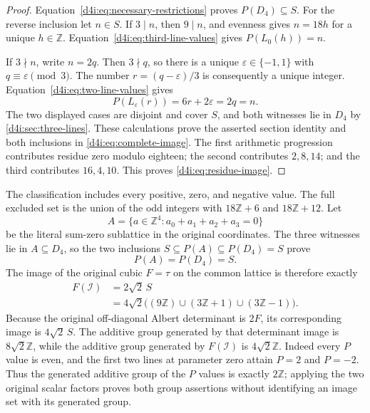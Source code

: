 \begin{proof}
Equation~\eqref{d4i:eq:necessary-restrictions} proves
$P(D_4)\subseteq S$. For the reverse inclusion let $n\in S$.
If $3\mid n$, then $9\mid n$, and evenness gives $n=18h$ for
a unique $h\in\mathbb Z$. Equation~\eqref{d4i:eq:third-line-values}
gives $P(L_0(h))=n$.

If $3\nmid n$, write $n=2q$. Then $3\nmid q$, so there is a
unique $\varepsilon\in\{-1,1\}$ with
$q\equiv\varepsilon\pmod3$. The number
$r=(q-\varepsilon)/3$ is consequently a unique integer.
Equation~\eqref{d4i:eq:two-line-values} gives
\[
                    P(L_\varepsilon(r))=6r+2\varepsilon=2q=n.
\]
The two displayed cases are disjoint and cover $S$, and both
witnesses lie in $D_4$ by \cref{d4i:sec:three-lines}. These
calculations prove the asserted section identity and both inclusions
in \eqref{d4i:eq:complete-image}. The first arithmetic progression
contributes residue zero modulo eighteen; the second contributes
$2,8,14$; and the third contributes $16,4,10$. This proves
\eqref{d4i:eq:residue-image}.
\end{proof}

The classification includes every positive, zero, and negative value.
The full excluded set is the union of the odd integers with
$18\mathbb Z+6$ and $18\mathbb Z+12$.
Let
\[
 A=\{a\in\mathbb Z^4:a_0+a_1+a_2+a_3=0\}
 \label{d4i:eq:sum-zero-slice}\tag{D4I15}
\]
be the literal sum-zero sublattice in the original coordinates. The
three witnesses lie in $A\subseteq D_4$, so the two inclusions
$S\subseteq P(A)\subseteq P(D_4)=S$ prove
\[
                              P(A)=P(D_4)=S.
 \label{d4i:eq:slice-image}\tag{D4I16}
\]
The image of the original cubic $F=\tau$ on the common lattice is
therefore exactly
\[
\begin{aligned}
 F(\mathcal I)&=2\sqrt2\,S\\
 &=4\sqrt2\bigl((9\mathbb Z)\cup(3\mathbb Z+1)
                                     \cup(3\mathbb Z-1)\bigr).
\end{aligned}
 \label{d4i:eq:original-cubic-image}\tag{D4I17}
\]
Because the original off-diagonal Albert determinant is $2F$, its
corresponding image is $4\sqrt2\,S$. The additive group generated
by that determinant image is $8\sqrt2\mathbb Z$, while the
additive group generated by $F(\mathcal I)$ is $4\sqrt2\mathbb Z$.
Indeed every $P$ value is even, and the first two lines at parameter
zero attain $P=2$ and $P=-2$. Thus the generated additive group of
the $P$ values is exactly $2\mathbb Z$; applying the two original
scalar factors proves both group assertions without identifying an
image set with its generated group.

